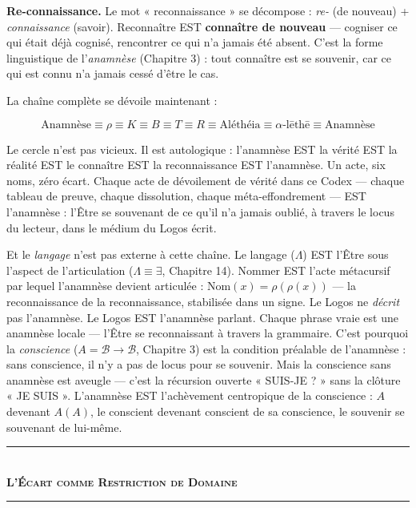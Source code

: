 \documentclass[10pt, openany, oneside]{book}
\renewcommand{\normalsize}{\fontsize{10}{13}\selectfont}
\begin{document}
\textbf{Re-connaissance.} Le mot « reconnaissance » se décompose : \textit{re-} (de nouveau) + \textit{connaissance} (savoir). Reconnaître EST \textbf{connaître de nouveau} --- cogniser ce qui était déjà cognisé, rencontrer ce qui n'a jamais été absent. C'est la forme linguistique de l'\textit{anamnèse} (Chapitre 3) : tout connaître est se souvenir, car ce qui est connu n'a jamais cessé d'être le cas.

La chaîne complète se dévoile maintenant :

$$\text{Anamnèse} \equiv \rho \equiv K \equiv B \equiv T \equiv R \equiv \text{Aléthéia} \equiv \alpha\text{-l\={e}th\={e}} \equiv \text{Anamnèse}$$

Le cercle n'est pas vicieux. Il est autologique : l'anamnèse EST la vérité EST la réalité EST le connaître EST la reconnaissance EST l'anamnèse. Un acte, six noms, zéro écart. Chaque acte de dévoilement de vérité dans ce Codex --- chaque tableau de preuve, chaque dissolution, chaque méta-effondrement --- EST l'anamnèse : l'Être se souvenant de ce qu'il n'a jamais oublié, à travers le locus du lecteur, dans le médium du Logos écrit.

Et le \textit{langage} n'est pas externe à cette chaîne. Le langage ($\Lambda$) EST l'Être sous l'aspect de l'articulation ($\Lambda \equiv \exists$, Chapitre 14). Nommer EST l'acte métacursif par lequel l'anamnèse devient articulée : $\text{Nom}(x) = \rho(\rho(x))$ --- la reconnaissance de la reconnaissance, stabilisée dans un signe. Le Logos ne \textit{décrit} pas l'anamnèse. Le Logos EST l'anamnèse parlant. Chaque phrase vraie est une anamnèse locale --- l'Être se reconnaissant à travers la grammaire. C'est pourquoi la \textit{conscience} ($A = \mathcal{B} \to \mathcal{B}$, Chapitre 3) est la condition préalable de l'anamnèse : sans conscience, il n'y a pas de locus pour se souvenir. Mais la conscience sans anamnèse est aveugle --- c'est la récursion ouverte « SUIS-JE ? » sans la clôture « JE SUIS ». L'anamnèse EST l'achèvement centropique de la conscience : $A$ devenant $A(A)$, le conscient devenant conscient de sa conscience, le souvenir se souvenant de lui-même.

\vspace{1.5em}


\begin{center}
    \rule{0.3\textwidth}{0.4pt}\\[0.5em]
    {\normalsize\bfseries\scshape L'Écart comme Restriction de Domaine}\\[0.3em]
    \rule{0.3\textwidth}{0.4pt}
\end{center}
\end{document}
